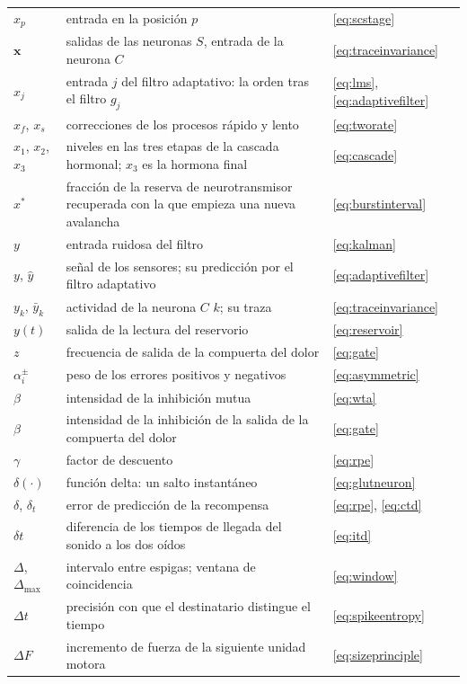 \begin{center}
\begin{longtable}{>{\raggedright}p{2.0cm}>{\raggedright}p{9.6cm}>{\raggedright\arraybackslash}p{2.4cm}}
$x_p$ & entrada en la posición $p$ & \eqref{eq:scstage} \\
$\mathbf x$ & salidas de las neuronas $S$, entrada de la neurona $C$ & \eqref{eq:traceinvariance} \\
$x_j$ & entrada $j$ del filtro adaptativo: la orden tras el filtro $g_j$ & \eqref{eq:lms}, \eqref{eq:adaptivefilter} \\
$x_f$, $x_s$ & correcciones de los procesos rápido y lento & \eqref{eq:tworate} \\
$x_1$, $x_2$, $x_3$ & niveles en las tres etapas de la cascada hormonal; $x_3$ es la hormona final & \eqref{eq:cascade} \\
$x^*$ & fracción de la reserva de neurotransmisor recuperada con la que empieza una nueva avalancha & \eqref{eq:burstinterval} \\
$y$ & entrada ruidosa del filtro & \eqref{eq:kalman} \\
$y$, $\hat y$ & señal de los sensores; su predicción por el filtro adaptativo & \eqref{eq:adaptivefilter} \\
$y_k$, $\bar y_k$ & actividad de la neurona $C$ $k$; su traza & \eqref{eq:traceinvariance} \\
$y(t)$ & salida de la lectura del reservorio & \eqref{eq:reservoir} \\
$z$ & frecuencia de salida de la compuerta del dolor & \eqref{eq:gate} \\
\midrule
$\alpha_i^\pm$ & peso de los errores positivos y negativos & \eqref{eq:asymmetric} \\
$\beta$ & intensidad de la inhibición mutua & \eqref{eq:wta} \\
$\beta$ & intensidad de la inhibición de la salida de la compuerta del dolor & \eqref{eq:gate} \\
$\gamma$ & factor de descuento & \eqref{eq:rpe} \\
$\delta(\cdot)$ & función delta: un salto instantáneo & \eqref{eq:glutneuron} \\
$\delta$, $\delta_t$ & error de predicción de la recompensa & \eqref{eq:rpe}, \eqref{eq:ctd} \\
$\delta t$ & diferencia de los tiempos de llegada del sonido a los dos oídos & \eqref{eq:itd} \\
$\Delta$, $\Delta_{\max}$ & intervalo entre espigas; ventana de coincidencia & \eqref{eq:window} \\
$\Delta t$ & precisión con que el destinatario distingue el tiempo & \eqref{eq:spikeentropy} \\
$\Delta F$ & incremento de fuerza de la siguiente unidad motora & \eqref{eq:sizeprinciple} \\

\end{longtable}
\end{center}
